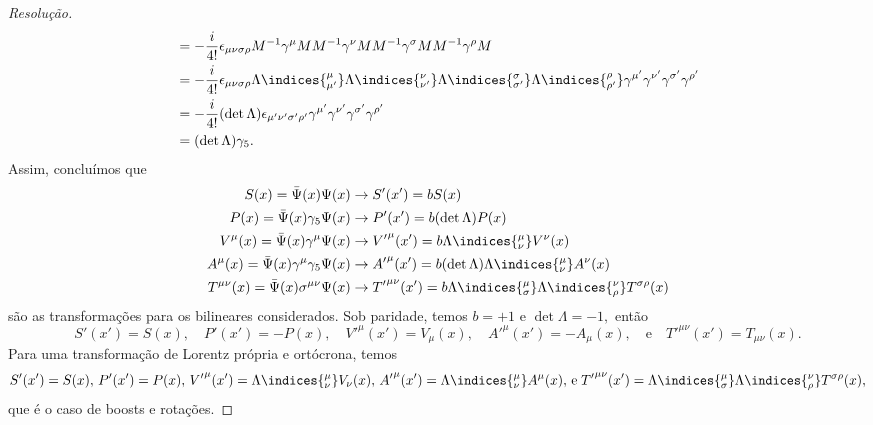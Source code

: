 \begin{proof}[Resolução]
\begin{align*}
                          &= -\frac{i}{4!} \epsilon_{\mu\nu\sigma\rho}M^{-1} \gamma^\mu M M^{-1} \gamma^\nu M M^{-1} \gamma^\sigma M M^{-1} \gamma^\rho M\\
                          &= -\frac{i}{4!} \epsilon_{\mu\nu\sigma\rho} \Lambda\indices{^\mu_{\mu'}}\Lambda\indices{^\nu_{\nu'}}\Lambda\indices{^\sigma_{\sigma'}} \Lambda\indices{^\rho_{\rho'}} \gamma^{\mu'} \gamma^{\nu'} \gamma^{\sigma'} \gamma^{\rho'}\\
                          &= -\frac{i}{4!} (\det \Lambda) \epsilon_{\mu'\nu'\sigma'\rho'} \gamma^{\mu'} \gamma^{\nu'} \gamma^{\sigma'} \gamma^{\rho'}\\
                          &= (\det \Lambda) \gamma_5.
    \end{align*}
    Assim, concluímos que
    \begin{align*}
        S(x) = \bar{\Psi}(x)\Psi(x) &\to S'(x') = bS(x)\\
        P(x) = \bar{\Psi}(x)\gamma_5 \Psi(x) &\to P'(x') = b(\det\Lambda)P(x)\\
        V^\mu(x) = \bar{\Psi}(x)\gamma^\mu \Psi(x) &\to {V'}^\mu(x') = b\Lambda\indices{^\mu_\nu} V^\nu(x)\\
        A^\mu(x) = \bar{\Psi}(x) \gamma^\mu \gamma_5 \Psi(x) &\to {A'}^\mu(x') = b (\det \Lambda) \Lambda\indices{^\mu_\nu}A^\nu(x)\\
        T^{\mu\nu}(x) = \bar{\Psi}(x) \sigma^{\mu\nu} \Psi(x) &\to {T'}^{\mu\nu}(x') = b \Lambda\indices{^\mu_\sigma}\Lambda\indices{^\nu_\rho}T^{\sigma \rho}(x)
    \end{align*}
    são as transformações para os bilineares considerados. Sob paridade, temos \(b = +1\) e \(\det \Lambda = -1,\) então
    \begin{equation*}
        S'(x') = S(x),\quad
        P'(x') = -P(x),\quad
        {V'}^\mu(x') = V_\mu(x),\quad
        {A'}^\mu(x') = -A_\mu(x),\quad\text{e}\quad
        {T'}^{\mu\nu}(x') = T_{\mu\nu}(x).
    \end{equation*} 
    Para uma transformação de Lorentz própria e ortócrona, temos 
    \begin{equation*}
        S'(x') = S(x),\,
        P'(x') = P(x),\,
        {V'}^\mu(x') = \Lambda\indices{^\mu_\nu}V_\nu(x),\,
        {A'}^\mu(x') = \Lambda\indices{^\mu_\nu}A^\mu(x),\,\text{e}\;
        {T'}^{\mu\nu}(x') = \Lambda\indices{^\mu_\sigma}\Lambda\indices{^\nu_\rho}T^{\sigma\rho}(x),
    \end{equation*}
    que é o caso de boosts e rotações.
\end{proof}
